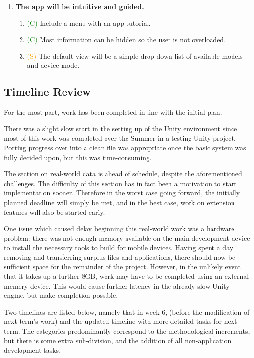 \documentclass{article}
\newcommand{\should}[1]{\textcolor{orange}{#1}}
\newcommand{\could}[1]{\textcolor{green}{#1}}
\begin{document}
\begin{enumerate}[label=\Roman*.]
\item \textbf{The app will be intuitive and guided.}
    \begin{enumerate}[label=\arabic*.]
    \item \could{(C)} Include a menu with an app tutorial.
    \item \could{(C)} Most information can be hidden so the user is not overloaded.
    \item \should{(S)} The default view will be a simple drop-down list of available models and device mode.
    \end{enumerate}
\end{enumerate}

\subsection{Timeline Review}
For the most part, work has been completed in line with the initial plan. 

There was a slight slow start in the setting up of the Unity environment since most of this work was completed over the Summer in a testing Unity project. Porting progress over into a clean file was appropriate once the basic system was fully decided upon, but this was time-consuming. 

The section on real-world data is ahead of schedule, despite the aforementioned challenges. The difficulty of this section has in fact been a motivation to start implementation sooner. Therefore in the worst case going forward, the initially planned deadline will simply be met, and in the best case, work on extension features will also be started early. 

One issue which caused delay beginning this real-world work was a hardware problem: there was not enough memory available on the main development device to install the necessary tools to build for mobile devices. Having spent a day removing and transferring surplus files and applications, there should now be sufficient space for the remainder of the project. However, in the unlikely event that it takes up a further 8GB, work may have to be completed using an external memory device. This would cause further latency in the already slow Unity engine, but make completion possible.

Two timelines are listed below, namely that in week 6, (before the modification of next term's work) and the updated timeline with more detailed tasks for next term. The categories predominantly correspond to the methodological increments, but there is some extra sub-division, and the addition of all non-application development tasks.
\end{document}
